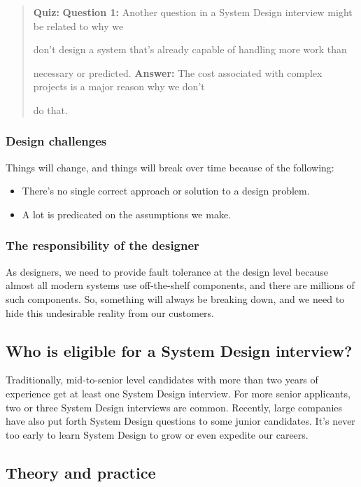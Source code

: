 \begin{quote}
\textbf{Quiz:}
\textbf{Question 1:} Another question in a System Design interview might be related to why we

don't design a system that's already capable of handling more work than

necessary or predicted.
\textbf{Answer:} The cost associated with complex projects is a major reason why we don't

do that.
\end{quote}

\subsubsection{Design challenges}\label{nZJnKsWiZ6bj_cIjKDdFU} Things will change, and things will break over time because of the following: \begin{itemize} \item {}\label{fiLYEOCeBPR1YLaGeiO7S} There's no single correct approach or solution to a design problem. \item {}\label{IXq9Ed_IvPwtFnOuQuv7H} A lot is predicated on the assumptions we make. \end{itemize} \subsubsection{The responsibility of the designer}\label{MTHYQVvlf7r6TLxOJsFHt} As designers, we need to provide fault tolerance at the design level because almost all modern systems use off-the-shelf components, and there are millions of such components. 
So, something will always be breaking down, and we need to hide this undesirable reality from our customers. \subsection{Who is eligible for a System Design interview?}\label{x5Sz5Sjx3GbmLnHTHXnIZ} Traditionally, mid-to-senior level candidates with more than two years of experience get at least one System Design interview. 
For more senior applicants, two or three System Design interviews are common. 
Recently, large companies have also put forth System Design questions to some junior candidates. 
It's never too early to learn System Design to grow or even expedite our careers. \subsection{Theory and practice}\label{Theory-and-practice}

